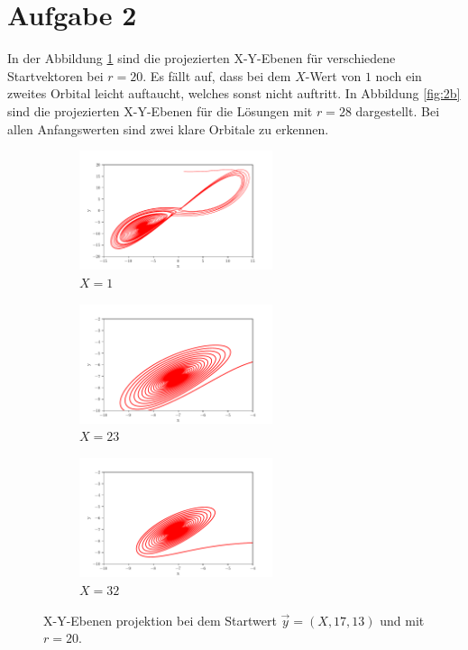 \section*{Aufgabe 2}
In der Abbildung \ref{fig:2a} sind die projezierten X-Y-Ebenen für verschiedene Startvektoren bei $r = 20$. 
Es fällt auf, dass bei dem $X$-Wert von $1$ noch ein zweites Orbital leicht auftaucht, welches sonst nicht auftritt.
In Abbildung \ref{fig:2b} sind die projezierten X-Y-Ebenen für die Lösungen mit $r = 28$ dargestellt.
Bei allen Anfangswerten sind zwei klare Orbitale zu erkennen.
\begin{figure}
    \begin{subfigure}{0.3\textwidth}
        \centering
        \includegraphics[height = 3.5cm]{build/pr20_1.pdf}
        \caption{$X = 1$}
    \end{subfigure}
    \hfill
    \begin{subfigure}{0.3\textwidth}
        \centering
        \includegraphics[height = 3.5cm]{build/pr20_23.pdf}
        \caption{$X = 23$}
    \end{subfigure}
    \hfill
    \begin{subfigure}{0.3\textwidth}
        \centering
        \includegraphics[height = 3.5cm]{build/pr20_32.pdf}
        \caption{$X = 32$}
    \end{subfigure}
    \caption{X-Y-Ebenen projektion bei dem Startwert $\vec{y} = (X, 17, 13)$ und mit $r = 20$.}
    \label{fig:2a}
\end{figure}
